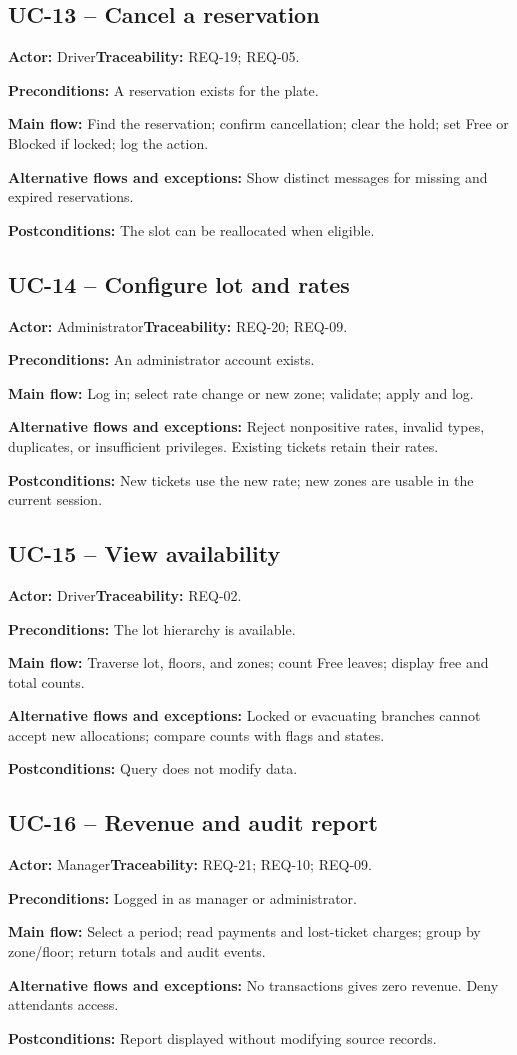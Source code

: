 \subsection{UC-13 -- Cancel a reservation}
\noindent\textbf{Actor:} Driver\quad\textbf{Traceability:} REQ-19; REQ-05.
\par\textbf{Preconditions:} A reservation exists for the plate.
\par\textbf{Main flow:} Find the reservation; confirm cancellation; clear the hold; set Free or Blocked if locked; log the action.
\par\textbf{Alternative flows and exceptions:} Show distinct messages for missing and expired reservations.
\par\textbf{Postconditions:} The slot can be reallocated when eligible.
\subsection{UC-14 -- Configure lot and rates}
\noindent\textbf{Actor:} Administrator\quad\textbf{Traceability:} REQ-20; REQ-09.
\par\textbf{Preconditions:} An administrator account exists.
\par\textbf{Main flow:} Log in; select rate change or new zone; validate; apply and log.
\par\textbf{Alternative flows and exceptions:} Reject nonpositive rates, invalid types, duplicates, or insufficient privileges. Existing tickets retain their rates.
\par\textbf{Postconditions:} New tickets use the new rate; new zones are usable in the current session.
\subsection{UC-15 -- View availability}
\noindent\textbf{Actor:} Driver\quad\textbf{Traceability:} REQ-02.
\par\textbf{Preconditions:} The lot hierarchy is available.
\par\textbf{Main flow:} Traverse lot, floors, and zones; count Free leaves; display free and total counts.
\par\textbf{Alternative flows and exceptions:} Locked or evacuating branches cannot accept new allocations; compare counts with flags and states.
\par\textbf{Postconditions:} Query does not modify data.
\subsection{UC-16 -- Revenue and audit report}
\noindent\textbf{Actor:} Manager\quad\textbf{Traceability:} REQ-21; REQ-10; REQ-09.
\par\textbf{Preconditions:} Logged in as manager or administrator.
\par\textbf{Main flow:} Select a period; read payments and lost-ticket charges; group by zone/floor; return totals and audit events.
\par\textbf{Alternative flows and exceptions:} No transactions gives zero revenue. Deny attendants access.
\par\textbf{Postconditions:} Report displayed without modifying source records.
